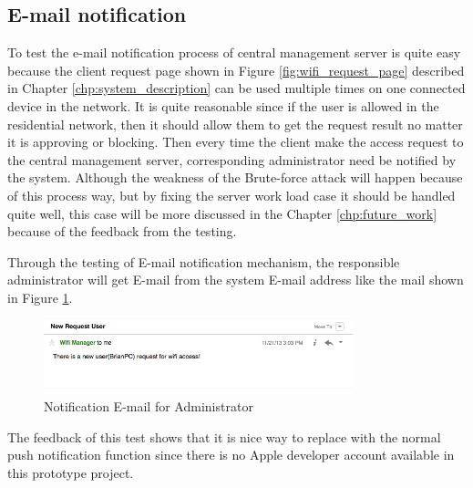 \subsection{E-mail notification}
\par To test the e-mail notification process of central management server is quite easy because the client request page shown in Figure \ref{fig:wifi_request_page} described in Chapter \ref{chp:system_description} can be used multiple times on one connected device in the network. It is quite reasonable since if the user is allowed in the residential network, then it should allow them to get the request result no matter it is approving or blocking. Then every time the client make the access request to the central management server, corresponding administrator need be notified by the system. Although the weakness of the Brute-force attack will happen because of this process way, but by fixing the server work load case it should be handled quite well, this case will be more discussed in the Chapter \ref{chp:future_work} because of the feedback from the testing.
\par Through the testing of E-mail notification mechanism, the responsible administrator will get E-mail from the system E-mail address like the mail shown in Figure \ref{fig:request_note_mail}.
\begin{figure}
	\centering
    	\includegraphics[width=0.80\textwidth,natwidth=610,natheight=642]{figs/request_note_mail.png}
  	\caption{Notification E-mail for Administrator}
  	\label{fig:request_note_mail}
\end{figure}
\par The feedback of this test shows that it is nice way to replace with the normal push notification function since there is no Apple developer account available in this prototype project.


